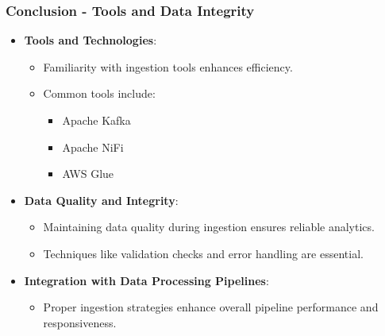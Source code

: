 \documentclass[aspectratio=169]{beamer}
\begin{document}
\begin{frame}[fragile]
    \frametitle{Conclusion - Tools and Data Integrity}

    \begin{itemize}
        \item \textbf{Tools and Technologies}:
        \begin{itemize}
            \item Familiarity with ingestion tools enhances efficiency.
            \item Common tools include:
            \begin{itemize}
                \item Apache Kafka
                \item Apache NiFi
                \item AWS Glue
            \end{itemize}
        \end{itemize}

        \item \textbf{Data Quality and Integrity}:
        \begin{itemize}
            \item Maintaining data quality during ingestion ensures reliable analytics.
            \item Techniques like validation checks and error handling are essential.
        \end{itemize}

        \item \textbf{Integration with Data Processing Pipelines}:
        \begin{itemize}
            \item Proper ingestion strategies enhance overall pipeline performance and responsiveness.
        \end{itemize}
    \end{itemize}
\end{frame}
\end{document}

